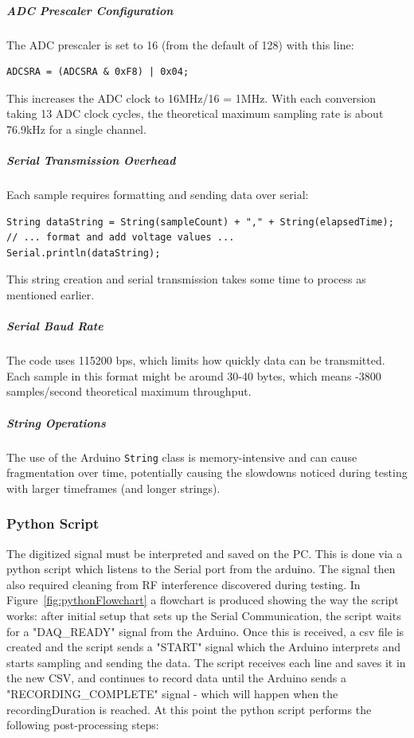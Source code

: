 \subparagraph{ADC Prescaler Configuration}
The ADC prescaler is set to 16 (from the default of 128) with this line:
\begin{verbatim}
ADCSRA = (ADCSRA & 0xF8) | 0x04;
\end{verbatim}
This increases the ADC clock to 16MHz/16 = 1MHz. With each conversion taking 13 ADC clock cycles, the theoretical maximum sampling rate is about 76.9kHz for a single channel.


\subparagraph{Serial Transmission Overhead}
Each sample requires formatting and sending data over serial:
\begin{verbatim}
String dataString = String(sampleCount) + "," + String(elapsedTime);
// ... format and add voltage values ...
Serial.println(dataString);
\end{verbatim}
This string creation and serial transmission takes some time to process as mentioned earlier.

\subparagraph{Serial Baud Rate}
The code uses 115200 bps, which limits how quickly data can be transmitted. Each sample in this format might be around 30-40 bytes, which means -3800 samples/second theoretical maximum throughput.

\subparagraph{String Operations}
The use of the Arduino \texttt{String} class is memory-intensive and can cause fragmentation over time, potentially causing the slowdowns noticed during testing with larger timeframes (and longer strings).

%
%
\subsubsection{Python Script}
\label{subsub:DAQpython}
The digitized signal must be interpreted and saved on the PC. This is done via a python script which listens to the Serial port from the arduino. The signal then also required cleaning from RF interference discovered during testing. In Figure~\ref{fig:pythonFlowchart} a flowchart is produced showing the way the script works: after initial setup that sets up the Serial Communication, the script waits for a "DAQ\_READY" signal from the Arduino. Once this is received, a csv file is created and the script sends a "START" signal which the Arduino interprets and starts sampling and sending the data. The script receives each line and saves it in the new CSV, and continues to record data until the Arduino sends a "RECORDING\_COMPLETE" signal - which will happen when the recordingDuration is reached. At this point the python script  performs the following post-processing steps:

